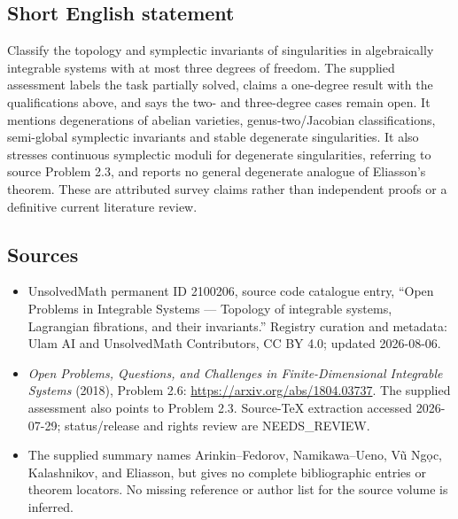 \documentclass[11pt]{article}
\begin{document}
\subsection{Short English statement}
Classify the topology and symplectic invariants of singularities in algebraically integrable systems with at most three degrees of freedom. The supplied assessment labels the task partially solved, claims a one-degree result with the qualifications above, and says the two- and three-degree cases remain open. It mentions degenerations of abelian varieties, genus-two/Jacobian classifications, semi-global symplectic invariants and stable degenerate singularities. It also stresses continuous symplectic moduli for degenerate singularities, referring to source Problem 2.3, and reports no general degenerate analogue of Eliasson's theorem. These are attributed survey claims rather than independent proofs or a definitive current literature review.
\subsection{Sources}
\begin{itemize}
\item UnsolvedMath permanent ID 2100206, source code catalogue entry, ``Open Problems in Integrable Systems --- Topology of integrable systems, Lagrangian fibrations, and their invariants.'' Registry curation and metadata: Ulam AI and UnsolvedMath Contributors, CC BY 4.0; updated 2026-08-06.
\item \emph{Open Problems, Questions, and Challenges in Finite-Dimensional Integrable Systems} (2018), Problem 2.6: \url{https://arxiv.org/abs/1804.03737}. The supplied assessment also points to Problem 2.3. Source-TeX extraction accessed 2026-07-29; status/release and rights review are NEEDS\_REVIEW.
\item The supplied summary names Arinkin--Fedorov, Namikawa--Ueno, Vũ Ngọc, Kalashnikov, and Eliasson, but gives no complete bibliographic entries or theorem locators. No missing reference or author list for the source volume is inferred.
\end{itemize}
\end{document}
